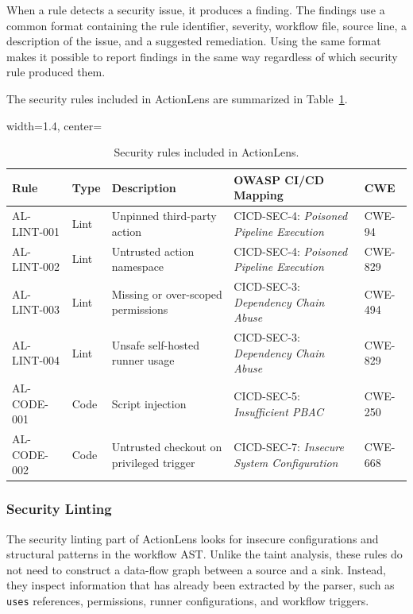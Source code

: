 \documentclass{article}
\begin{document}
When a rule detects a security issue, it produces a finding. The findings use a common format containing the rule identifier, severity, workflow file, source line, a description of the issue, and a suggested remediation. Using the same format makes it possible to report findings in the same way regardless of which security rule produced them.

The security rules included in ActionLens are summarized in Table~\ref{tab:security-rules}.

\begin{table}[h]
    \centering
    \caption{Security rules included in ActionLens.}
    \begin{adjustbox}{width=1.4\textwidth, center=\textwidth}
        \begin{tabular}{lllll}
        \hline
        \textbf{Rule} & \textbf{Type} & \textbf{Description} & \textbf{OWASP CI/CD Mapping} & \textbf{CWE} \\
        \hline
        AL-LINT-001 & Lint & Unpinned third-party action & CICD-SEC-4: \textit{Poisoned Pipeline Execution} & CWE-94 \\
        AL-LINT-002 & Lint & Untrusted action namespace & CICD-SEC-4: \textit{Poisoned Pipeline Execution} & CWE-829 \\
        AL-LINT-003 & Lint & Missing or over-scoped permissions & CICD-SEC-3: \textit{Dependency Chain Abuse} & CWE-494 \\
        AL-LINT-004 & Lint & Unsafe self-hosted runner usage & CICD-SEC-3: \textit{Dependency Chain Abuse} & CWE-829 \\
        AL-CODE-001 & Code & Script injection & CICD-SEC-5: \textit{Insufficient PBAC} & CWE-250 \\
        AL-CODE-002 & Code & Untrusted checkout on privileged trigger & CICD-SEC-7: \textit{Insecure System Configuration} & CWE-668 \\
        \hline
    \end{tabular}
    \end{adjustbox}
    \label{tab:security-rules}
\end{table}

\subsubsection{Security Linting}

The security linting part of ActionLens looks for insecure configurations and structural patterns in the workflow AST. Unlike the taint analysis, these rules do not need to construct a data-flow graph between a source and a sink. Instead, they inspect information that has already been extracted by the parser, such as \texttt{uses} references, permissions, runner configurations, and workflow triggers.
\end{document}
